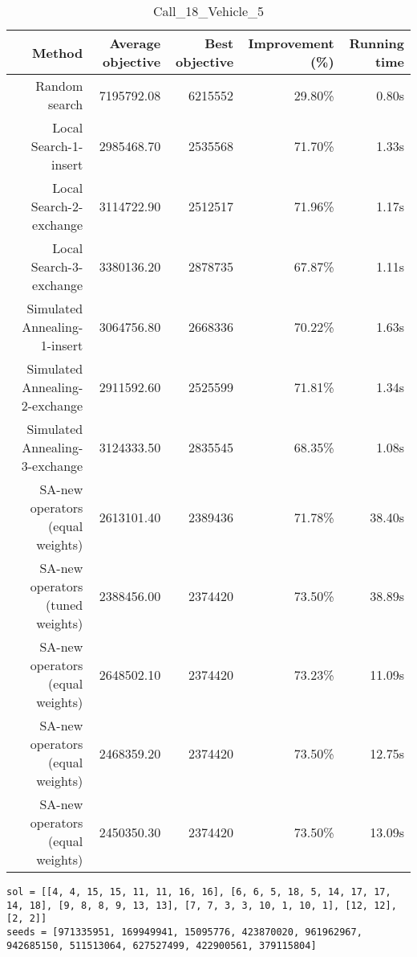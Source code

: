 \begin{table}[ht]
\centering
\caption{Call\_18\_Vehicle\_5}
\label{tab:call18vehicle5}
\begin{tabular}{|r|r|r|r|r|}
Method & Average objective & Best objective & Improvement (\%) & Running time \\
\hline
Random search & 7195792.08 & 6215552 & 29.80\% & 0.80s\\
Local Search-1-insert & 2985468.70 & 2535568 & 71.70\% & 1.33s\\
Local Search-2-exchange & 3114722.90 & 2512517 & 71.96\% & 1.17s\\
Local Search-3-exchange & 3380136.20 & 2878735 & 67.87\% & 1.11s\\
Simulated Annealing-1-insert & 3064756.80 & 2668336 & 70.22\% & 1.63s\\
Simulated Annealing-2-exchange & 2911592.60 & 2525599 & 71.81\% & 1.34s\\
Simulated Annealing-3-exchange & 3124333.50 & 2835545 & 68.35\% & 1.08s\\
SA-new operators (equal weights) & 2613101.40 & 2389436 & 71.78\% & 38.40s\\
SA-new operators (tuned weights) & 2388456.00 & 2374420 & 73.50\% & 38.89s\\
SA-new operators (equal weights) & 2648502.10 & 2374420 & 73.23\% & 11.09s\\
SA-new operators (equal weights) & 2468359.20 & 2374420 & 73.50\% & 12.75s\\
SA-new operators (equal weights) & 2450350.30 & 2374420 & 73.50\% & 13.09s\\
\end{tabular}%
\end{table}
\begin{lstlisting}[label={lst:call18vehicle5},caption=Optimal solution call\_18\_vehicle\_5]
sol = [[4, 4, 15, 15, 11, 11, 16, 16], [6, 6, 5, 18, 5, 14, 17, 17, 14, 18], [9, 8, 8, 9, 13, 13], [7, 7, 3, 3, 10, 1, 10, 1], [12, 12], [2, 2]]
seeds = [971335951, 169949941, 15095776, 423870020, 961962967, 942685150, 511513064, 627527499, 422900561, 379115804]
\end{lstlisting}%
\clearpage


